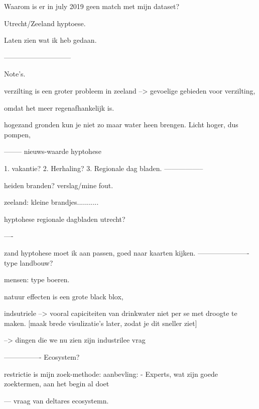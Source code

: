 Waarom is er in july 2019 geen match met mijn dataset?

Utrecht/Zeeland hyptoese.


Laten zien wat ik heb gedaan.

-----------------------------


Note's. 

verzilting is een groter probleem in zeeland --> gevoelige gebieden voor verzilting,

omdat het meer regenafhankelijk is.

hogezand gronden kun je niet zo maar water heen brengen. Licht hoger, dus pompen, 


--------
nieuws-waarde hyptohese

1. vakantie?
2. Herhaling?
3. Regionale dag bladen.
-----------------

heiden branden?
verslag/mine fout.


zeeland: kleine brandjes...........



hyptohese regionale dagbladen utrecht?


----

zand hyptohese moet ik aan passen, goed naar kaarten kijken.
----------------------
type landbouw?

mensen: type boeren.

natuur effecten is een grote black blox,

indsutriele --> vooral capiciteiten van drinkwater niet per se met droogte te maken. [maak brede visulizatie's later, zodat je dit sneller ziet]

--> dingen die we nu zien zijn industrilee vrag


----------------
Ecosystem?


restrictie is mijn zoek-methode: aanbevling: 
- Experts, wat zijn goede zoektermen, aan het begin al doet


--- vraag van deltares ecosystemn.